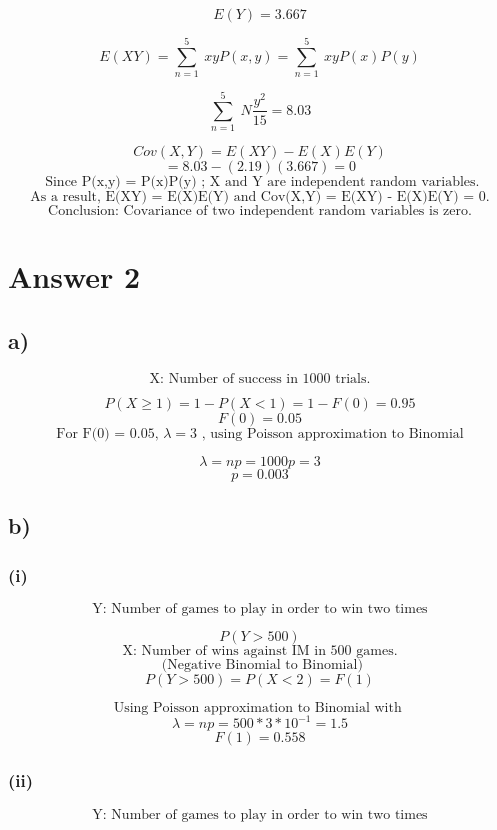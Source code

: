 \documentclass[12pt]{article}
\begin{document}
\[ E(Y)  = 3.667 \]

\[ E(XY) = \sum_{n=1}^{5} \ xyP(x,y) = \sum_{n=1}^{5} \ xyP(x)P(y)  \]

\[ \sum_{n=1}^{5} \ N\frac{y^{2}}{15} = 8.03 \]

\[ Cov(X,Y) = E(XY) - E(X)E(Y) \]
\[ = 8.03 - (2.19)(3.667) = 0\]  
\[ \text{ Since P(x,y) = P(x)P(y) ;  X and Y are independent random variables.} \]
\[ \text{As a result, E(XY) = E(X)E(Y)  and Cov(X,Y) = E(XY) - E(X)E(Y) = 0.}\]
\[ \text{Conclusion: Covariance of two independent random variables is zero.} \]



\section*{Answer 2}


\subsection*{a)} 

\[ \text{X: Number of success in 1000 trials.} \]

\[ P(X \ge 1) = 1 - P(X < 1) = 1- F(0) = 0.95 \]
\[ F(0) = 0.05 \]
\[ \text{ For F(0) = 0.05, }  \lambda = 3 \text{ , using Poisson approximation to Binomial } \]

\[ \lambda = np = 1000p = 3 \]
\[ p = 0.003 \]

\subsection*{b)} 
\subsubsection*{(i)} 
\[ \text{Y: Number of games to play in order to win two times} \]

\[ P(Y > 500) \]
\[ \text{X: Number of wins against IM in 500 games.} \]
\[ \text{ (Negative Binomial to Binomial)} \] 
\[ P(Y > 500 ) = P(X < 2) = F(1) \] 

\[ \text{Using Poisson approximation to Binomial with } \]
\[ \lambda = np = 500 * 3 * 10^{-1} = 1.5 \]
\[ F(1) = 0.558\]

\subsubsection*{(ii)}

\[ \text{Y: Number of games to play in order to win two times} \]
\end{document}
